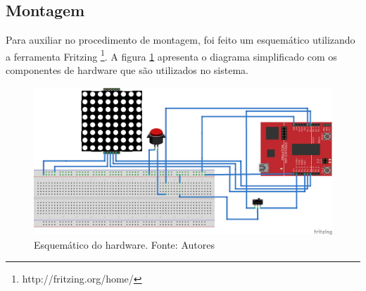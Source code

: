 \documentclass[conference]{IEEEtran}
\begin{document}
%
%
%

\subsection{Montagem}
Para auxiliar no procedimento de montagem, foi feito um esquemático utilizando a ferramenta Fritzing \footnote{http://fritzing.org/home/}. A figura \ref{fig:fritzing} apresenta o diagrama simplificado com os componentes de hardware que são utilizados no sistema. 
\begin{figure}[H]
  \centering
  \includegraphics[width=1\linewidth]{trab_bb}
  \caption{Esquemático do hardware. Fonte: Autores}
  \label{fig:fritzing}
\end{figure}
\end{document}
